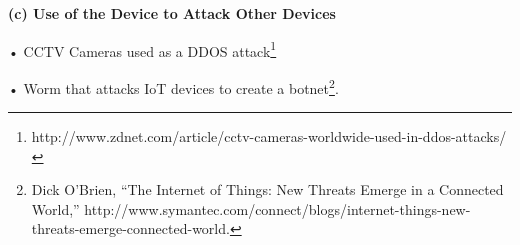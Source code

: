 \textbf{(c) Use of the Device to Attack Other Devices}

• CCTV Cameras used as a DDOS attack\footnote{http://www.zdnet.com/article/cctv-cameras-worldwide-used-in-ddos-attacks/}

• Worm that attacks IoT devices to create a botnet\footnote{Dick
  O'Brien, ``The Internet of Things: New Threats Emerge in a Connected
  World,''
  http://www.symantec.com/connect/blogs/internet-things-new-threats-emerge-connected-world.}.